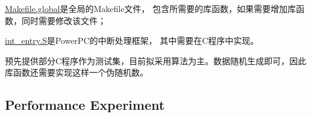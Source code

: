 \documentclass[hyperref,UTF8]{ctexart}
\theoremstyle{definition}
\theoremstyle{remark}
\numberwithin{equation}{subsection}
\begin{document}
	\href{https://github.com/Turf1013/PPC_AutoTool/blob/master/PPC/global/Makefile.global}{Makefile.global}是全局的Makefile文件，
	包含所需要的库函数，如果需要增加库函数，同时需要修改该文件；
	
	\href{https://github.com/Turf1013/PPC_AutoTool/blob/master/PPC/global/int_entry.S}{int\_entry.S}是PowerPC的中断处理框架，
	其中需要在C程序中实现。
	
	预先提供部分C程序作为测试集，目前拟采用算法为主。数据随机生成即可，因此库函数还需要实现这样一个伪随机数。

\subsection{Performance Experiment}
	
\end{document}
